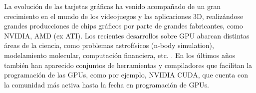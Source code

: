 La evolución de las tarjetas gráficas ha venido acompañado de un gran crecimiento en el mundo de los videojuegos y las aplicaciones 3D, realizándose grandes
producciones de chips gráficos por parte de grandes fabricantes, como NVIDIA, AMD (ex ATI). Los recientes desarrollos sobre GPU abarcan distintas áreas de la ciencia,
como problemas astrofísicos (n-body simulation), modelamiento molecular, computación financiera, etc. \cite{kirk2010programming}. En los últimos años también han aparecido 
conjuntos de herramientas y compiladores que facilitan la programación de las GPUs, como por ejemplo, NVIDIA CUDA, que cuenta con la comunidad más activa hasta 
la fecha en programación de GPUs.

%
%
%

